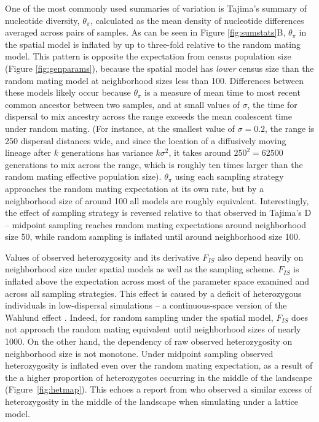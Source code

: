 \documentclass[10pt,twoside,lineno,hidelinks]{preprint}
\begin{document}
One of the most commonly used summaries of variation is Tajima's summary of nucleotide diversity, $\theta_{\pi}$, calculated as the mean density of nucleotide differences averaged across pairs of samples. As can be seen in Figure \ref{fig:sumstats}B, $\theta_{\pi}$ in the spatial model is inflated by up to three-fold relative to the random mating model. This pattern is opposite the expectation from census population size (Figure \ref{fig:genparams}), because the spatial model has \emph{lower} census size than the random mating model at neighborhood sizes less than 100. Differences between these models likely occur because $\theta_{\pi}$ is a measure of mean time to most recent common ancestor between two samples, and at small values of $\sigma$, the time for dispersal to mix ancestry across the range exceeds the mean coalescent time under random mating. (For instance, at the smallest value of $\sigma=0.2$, the range is 250 dispersal distances wide, and since the location of a diffusively moving lineage after $k$ generations has variance $k \sigma^2$, it takes around $250^2 = 62500$ generations to mix across the range, which is roughly ten times larger than the random mating effective population size). $\theta_{\pi}$ using each sampling strategy approaches the random mating expectation at its own rate, but by a neighborhood size of around 100 all models are roughly equivalent. Interestingly, the effect of sampling strategy is reversed relative to that observed in Tajima's D -- midpoint sampling reaches random mating expectations around neighborhood size 50, while random sampling is inflated until around neighborhood size 100. 

Values of observed heterozygosity and its derivative $F_{IS}$ also depend heavily on neighborhood size under spatial models as well as the sampling scheme. $F_{IS}$ is inflated above the expectation across most of the parameter space examined and across all sampling strategies. This effect is caused by a deficit of heterozygous individuals in low-dispersal simulations -- a continuous-space version of the Wahlund effect \citep{Wahlund1928}. Indeed, for random sampling under the spatial model, $F_{IS}$ does not approach the random mating equivalent until neighborhood sizes of nearly 1000. On the other hand, the dependency of raw observed heterozygosity on neighborhood size is not monotone. Under midpoint sampling observed heterozygosity is inflated even over the random mating expectation, as a result of the a higher proportion of heterozygotes occurring in the middle of the landscape (Figure~\ref{fig:hetmap}). This echoes a report from \citet{Shirk2014} who observed a similar excess of heterozygosity in the middle of the landscape when simulating under a lattice model.
\end{document}

